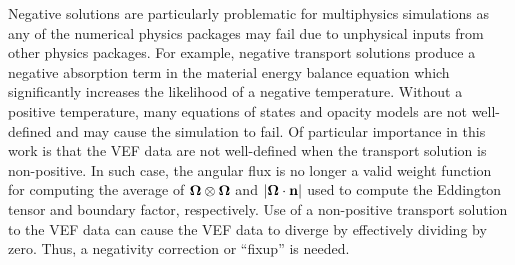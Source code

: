 \documentclass[../doc.tex]{subfiles}
\begin{document}
Negative solutions are particularly problematic for multiphysics simulations as any of the numerical physics packages may fail due to unphysical inputs from other physics packages. For example, negative transport solutions produce a negative absorption term in the material energy balance equation which significantly increases the likelihood of a negative temperature. Without a positive temperature, many equations of states and opacity models are not well-defined and may cause the simulation to fail. Of particular importance in this work is that the VEF data are not well-defined when the transport solution is non-positive. In such case, the angular flux is no longer a valid weight function for computing the average of $\boldsymbol{\Omega}\otimes\boldsymbol{\Omega}$ and $|\boldsymbol{\Omega}\cdot\boldsymbol{\mathrm{n}}|$ used to compute the Eddington tensor and boundary factor, respectively. Use of a non-positive transport solution to the VEF data can cause the VEF data to diverge by effectively dividing by zero. 
Thus, a negativity correction or ``fixup'' is needed. 
\end{document}

